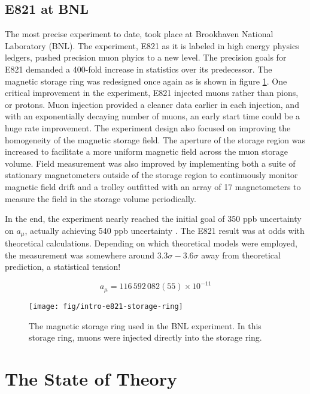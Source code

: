 \subsection{E821 at BNL}
The most precise \mugmtwo experiment to date, took place at Brookhaven National Laboratory (BNL). The experiment, E821 as it is labeled in high energy physics ledgers, pushed precision muon phyics to a new level.  The precision goals for E821 demanded a 400-fold increase in statistics over its predecessor.  The magnetic storage ring was redesigned once again as is shown in figure \ref{fig:intro-e821-storage-ring}.  One critical improvement in the experiment, E821 injected muons rather than pions, or protons.  Muon injection provided a cleaner data earlier in each injection, and with an exponentially decaying number of muons, an early start time could be a huge rate improvement.  The experiment design also focused on improving the homogeneity of the magnetic storage field.  The aperture of the storage region was increased to facilitate a more uniform magnetic field across the muon storage volume.  Field measurement was also improved by implementing both a suite of stationary magnetometers outside of the storage region to continuously monitor magnetic field drift and a trolley outfitted with an array of 17 magnetometers to measure the field in the storage volume periodically.

In the end, the experiment nearly reached the initial goal of 350 ppb uncertainty on $a_\mu$, actually achieving 540 ppb uncertainty \cite{e821-prd}.  The E821 \gmtwo result was at odds with theoretical calculations.  Depending on which theoretical models were employed, the measurement was somewhere around $3.3\sigma - 3.6\sigma$ away from theoretical prediction, a statistical tension!

\begin{equation}
\label{eqn:e821-results}
a_\mu = 116\,592\,082 (55) \times 10^{-11}
\end{equation}

\begin{figure}
\centering
\texttt{[image: fig/intro-e821-storage-ring]}
\caption{
    The magnetic storage ring used in the BNL experiment.  In this storage ring, muons were injected directly into the storage ring.
    \label{fig:intro-e821-storage-ring}
}
\end{figure}

\section{The State of Theory} \label{sec:theory}

